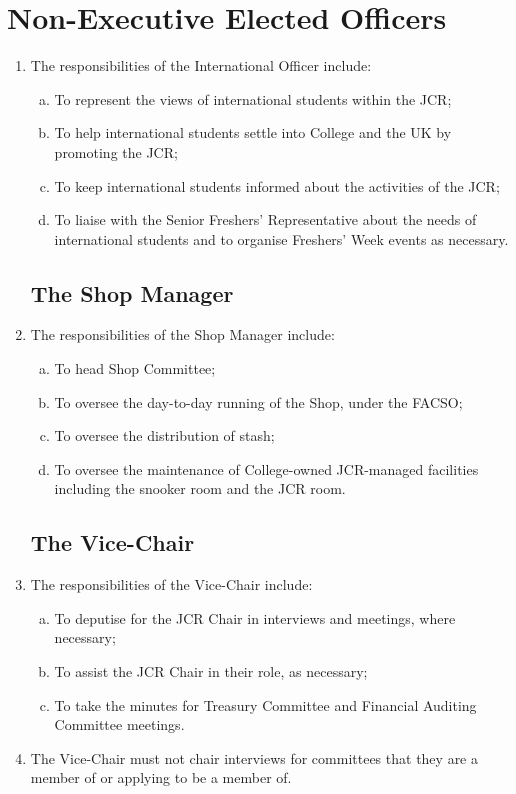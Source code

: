 \documentclass[12pt]{article}  %
\begin{document}
\section{Non-Executive Elected Officers}
\begin{enumerate}
    \subsection{The International Officer}
    \item The responsibilities of the International Officer include:
    \begin{enumerate}[(a)]
        \item To represent the views of international students within the JCR;
        \item To help international students settle into College and the UK by promoting the JCR;
        \item To keep international students informed about the activities of the JCR;
        \item To liaise with the Senior Freshers’ Representative about the needs of international students and to organise Freshers’ Week events as necessary.
    \end{enumerate}
    \subsection{The Shop Manager}
    \item The responsibilities of the Shop Manager include:
    \begin{enumerate}[(a)]
        \item To head Shop Committee;
        \item To oversee the day-to-day running of the Shop, under the FACSO;
        \item To oversee the distribution of stash;
        \item To oversee the maintenance of College-owned JCR-managed facilities including the snooker room and the JCR room.
    \end{enumerate}
    \subsection{The Vice-Chair}
    \item The responsibilities of the Vice-Chair include:
    \begin{enumerate}[(a)]
        \item To deputise for the JCR Chair in interviews and meetings, where necessary;
        \item To assist the JCR Chair in their role, as necessary;
        \item To take the minutes for Treasury Committee and Financial Auditing Committee meetings.
    \end{enumerate}
    \item The Vice-Chair must not chair interviews for committees that they are a member of or applying to be a member of.
\end{enumerate}
\newpage
\end{document}
